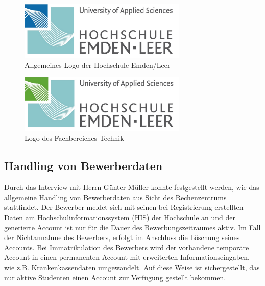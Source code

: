 \begin{figure}[h!]
	\centering
	\includegraphics[width=8cm]{kapitel/gruppe2/bilder/hs_logo_allgemein}
	\caption{Allgemeines Logo der Hochschule Emden/Leer}
	\label{fig_logo_allgemein}
\end{figure}

\begin{figure}[h!]
	\centering
	\includegraphics[width=8cm]{kapitel/gruppe2/bilder/hs_logo_technik}
	\caption{Logo des Fachbereiches Technik}
	\label{fig_logo_fb_technik}
\end{figure}

\subsection{Handling von Bewerberdaten}
Durch das Interview mit Herrn Günter Müller konnte festgestellt werden, wie das allgemeine Handling von Bewerberdaten aus Sicht des Rechenzentrums stattfindet. 
Der Bewerber meldet sich mit seinen bei Registrierung erstellten Daten am Hochschulinformationssystem (HIS) der Hochschule an und der generierte Account ist nur für die Dauer des Bewerbungszeitraumes aktiv. Im Fall der Nichtannahme des Bewerbers, erfolgt im Anschluss die Löschung seines Accounts. Bei Immatrikulation des Bewerbers wird der vorhandene temporäre Account in einen permanenten Account mit erweiterten Informationseingaben, wie z.B. Krankenkassendaten umgewandelt. Auf diese Weise ist sichergestellt, das nur aktive Studenten einen Account zur Verfügung gestellt bekommen. 